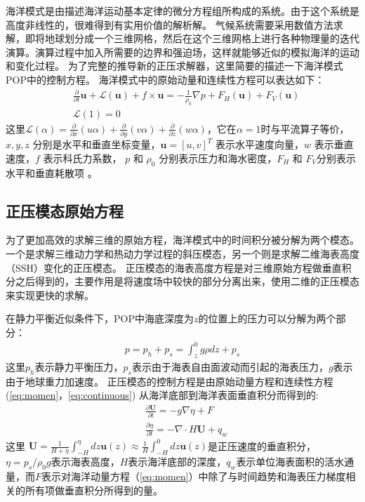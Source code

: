 海洋模式是由描述海洋运动基本定律的微分方程组所构成的系统。由于这个系统是高度非线性的，很难得到有实用价值的解析解。
气候系统需要采用数值方法求解，即将地球划分成一个三维网格，然后在这个三维网格上进行各种物理量的迭代演算。演算过程中加入所需要的边界和强迫场，这样就能够近似的模拟海洋的运动和变化过程。
为了完整的推导新的正压求解器，这里简要的描述一下海洋模式POP中的控制方程。
海洋模式中的原始动量和连续性方程可以表达如下：
\begin{align}
&\frac{\partial }{\partial t} \textbf{u} +\mathcal{L}(\textbf{u}) + f\times \textbf{u} = - \frac{1}{\rho_0}\nabla p +F_H(\textbf{u}) +F_V(\textbf{u}) \label{eq:momen}\\
&\mathcal{L}(1) = 0 \label{eq:continuous}
\end{align}
这里$\mathcal{L}(\alpha ) = \frac{\partial }{\partial x} (u\alpha)  +\frac{\partial }{\partial y} (v\alpha) +\frac{\partial }{\partial z} (w\alpha)$，它在$\alpha =1$时与平流算子等价，$x, y, z$ 分别是水平和垂直坐标变量，$\textbf{u} = [u, v]^T$ 表示水平速度向量，$w$ 表示垂直速度，$f$ 表示科氏力系数， $p$ 和 $\rho_0$ 分别表示压力和海水密度，$F_H$ 和 $F_V$分别表示水平和垂直耗散项 \cite{smith2010parallel}。  


\subsection{正压模态原始方程} \label{solver:mode}

为了更加高效的求解三维的原始方程，海洋模式中的时间积分被分解为两个模态。 一个是求解三维动力学和热动力学过程的斜压模态，另一个则是求解二维海表高度（SSH）变化的正压模态。
正压模态的海表高度方程是对三维原始方程做垂直积分之后得到的，主要作用是将速度场中较快的部分分离出来，使用二维的正压模态来实现更快的求解。

在静力平衡近似条件下，POP中海底深度为$z$的位置上的压力可以分解为两个部分：  
\begin{align}
\displaystyle p = p_h + p_s = \int^0_z g\rho dz +p_s
\end{align}
这里$p_h$表示静力平衡压力，$p_s$表示由于海表自由面波动而引起的海表压力，$g$表示由于地球重力加速度。 
正压模态的控制方程是由原始动量方程和连续性方程(\ref{eq:momen}，\ref{eq:continuous}) 从海洋底部到海洋表面垂直积分而得到的:
\begin{align}
&\displaystyle \frac{\partial \textbf{U} }{\partial t}  = -g \nabla \eta + F  \label{eq:baro_mon}\\
&\displaystyle \frac{\partial \eta }{\partial t} = - \nabla \cdot H\textbf{U} + q_w  \label{eq:baro_con}
\end{align}
这里  $\textbf{U} =  \frac{1}{H+\eta}\int_{-H}^\eta dz \textbf{u}(z) \approx \frac{1}{H }\int_{-H}^0 dz \textbf{u}(z)$是正压速度的垂直积分，
$\eta = p_s/{\rho_0g}$表示海表高度，$H$表示海洋底部的深度，$q_w$表示单位海表面积的活水通量，而$F$表示对海洋动量方程（\ref{eq:momen}）中除了与时间趋势和海表压力梯度相关的所有项做垂直积分所得到的量。
 
